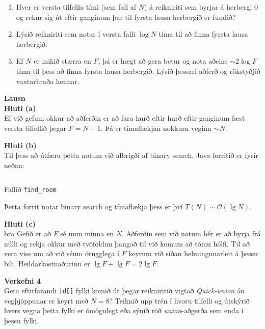 \documentclass[12pt, a4paper, hidelinks]{article}
\begin{document}
\begin{enumerate}[label=(\alph*)]
    \item Hver er versta tilfellis tími (sem fall af $N$) á reikniriti sem byrjar á herbergi $0$ og rekur sig út eftir ganginum þar til fyrsta
    lausa herbergið er fundið?
    \item Lýsið reikniriti sem notar í versta falli $\log N$ tíma til að finna fyrsta lausa herbergið.
    \item Ef $N$ er mikið stærra en $F$, þá er hægt að gera betur og nota aðeins $\sim 2 \log F$ tíma til þess að finna fyrsta lausa herbergið.
    Lýsið þessari aðferð og rökstyðjið vaxtarhraða hennar.
\end{enumerate}

\medskip
\noindent
\textbf{\large Lausn} \medskip \\
\textbf{Hluti (a)} \medskip \\
Ef við gefum okkur að aðferðin er að fara hurð eftir hurð eftir ganginum fæst versta tilfellið þegar
$F = N-1$. Þá er tímaflækjan nokkurn veginn $\sim N$.

\newpage
\noindent
\textbf{Hluti (b)} \medskip \\
Til þess að útfæra þetta notum við afbrigði af binary search. Java forritið er fyrir neðan:

\begin{listing}[ht!]
    \centering
    \inputminted[firstline=5, lastline=18, linenos]{java}{../src/V3/HotelRoom.java}
    \caption{Fallið \texttt{find\_room}}
\end{listing}

\noindent
Þetta forrit notar binary search og tímaflækja þess er því $T(N) \sim \mathcal O(\lg N)$.

\medskip
\noindent
\textbf{Hluti (c)} \medskip \\bra
Gefið er að $F$ sé mun minna en $N$. Aðferðin sem við notum hér er að byrja frá núlli og rekja okkur
með tvöföldun þangað til við komum að tómu hólfi. Til að vera viss um að við séum örugglega í $F$ keyrum
við síðan helmingunarleit á þessu bili. Heildarkostnaðurinn er $\lg F + \lg F =  2\lg F$.

\newpage
\noindent
\textbf{\large Verkefni 4} \medskip \\
Geta eftirfarandi \texttt{id[]} fylki komið út þegar reikniritið vigtað \emph{Quick-union}
án vegþjöppunar er keyrt með $N = 8$? Teiknið upp trén í hvoru tilfelli og útskýrið hvers vegna
þetta fylki er ómögulegt eða sýnið röð \emph{union}-aðgerða sem enda í þessu fylki.
\end{document}
